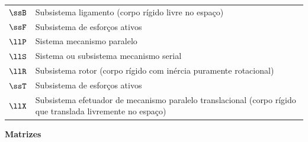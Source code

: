 \documentclass[]{politex}
\begin{document}
\begin{longtable}{lp{}}
  $\ssB$ & Subsistema ligamento (corpo rígido livre no espaço) \\
  $\ssF$ & Subsistema de esforços ativos \\
  $\llP$ & Sistema mecanismo paralelo \\
  $\llS$ & Sistema ou subsistema mecanismo serial \\
  $\llR$ & Subsistema rotor (corpo rígido com inércia puramente rotacional) \\
  $\ssT$ & Subsistema de esforços ativos \\
  $\llX$ & Subsistema efetuador de mecanismo paralelo translacional (corpo rígido que translada livremente no espaço) \\
\end{longtable}
\begin{center} \begin{Large} \textbf{Matrizes} \end{Large} \end{center}
\end{document}
